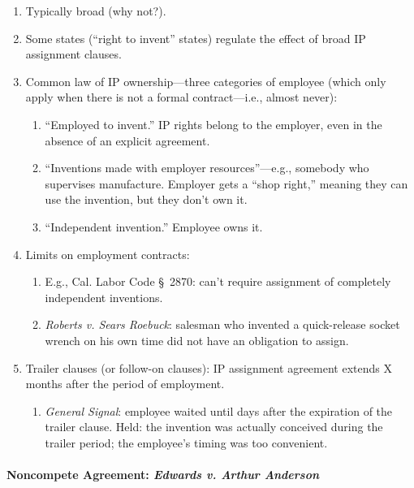\begin{enumerate}
    \item Typically broad (why not?).
    \item Some states (``right to invent'' states) regulate the effect of 
    broad IP assignment clauses.
    \item Common law of IP ownership---three categories of employee (which 
    only apply when there is not a formal contract---i.e., almost never):
    \begin{enumerate}
        \item ``Employed to invent.'' IP rights belong to the employer, even 
        in the absence of an explicit agreement.
        \item ``Inventions made with employer resources''---e.g., somebody who 
        supervises manufacture. Employer gets a ``shop right,'' meaning they 
        can use the invention, but they don't own it.
        \item ``Independent invention.'' Employee owns it.
    \end{enumerate}
    \item Limits on employment contracts:
    \begin{enumerate}
        \item E.g., Cal. Labor Code \S\ 2870: can't require assignment of 
        completely independent inventions.
        \item \emph{Roberts v. Sears Roebuck}: salesman who invented a 
        quick-release socket wrench on his own time did not have an obligation 
        to assign.
    \end{enumerate}
    \item Trailer clauses (or follow-on clauses): IP assignment agreement 
    extends X months after the period of employment.
    \begin{enumerate}
        \item \emph{General Signal}: employee waited until days after the 
        expiration of the trailer clause. Held: the invention was actually 
        conceived during the trailer period; the employee's timing was too 
        convenient.
    \end{enumerate}
\end{enumerate}

\paragraph{Noncompete Agreement: \emph{Edwards v. Arthur Anderson}}

